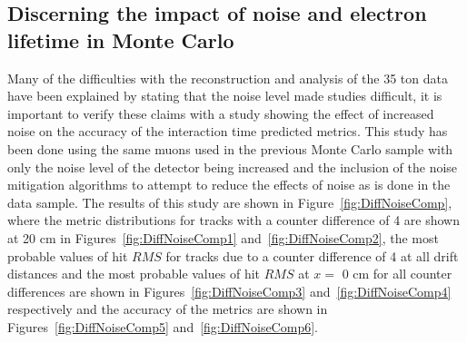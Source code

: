 \subsection{Discerning the impact of noise and electron lifetime in Monte Carlo} \label{sec:DiffMCStudies}
Many of the difficulties with the reconstruction and analysis of the 35 ton data have been explained by stating that the noise level made studies difficult, it is important to verify these claims with a study showing the effect of increased noise on the accuracy of the interaction time predicted metrics. This study has been done using the same muons used in the previous Monte Carlo sample with only the noise level of the detector being increased and the inclusion of the noise mitigation algorithms to attempt to reduce the effects of noise as is done in the data sample. The results of this study are shown in Figure~\ref{fig:DiffNoiseComp}, where the metric distributions for tracks with a counter difference of 4 are shown at 20 cm in Figures~\ref{fig:DiffNoiseComp1} and~\ref{fig:DiffNoiseComp2}, the most probable values of hit $RMS$ for tracks due to a counter difference of 4 at all drift distances and the most probable values of hit $RMS$ at $x =$ 0 cm for all counter differences are shown in Figures~\ref{fig:DiffNoiseComp3} and~\ref{fig:DiffNoiseComp4} respectively and the accuracy of the metrics are shown in Figures~\ref{fig:DiffNoiseComp5} and~\ref{fig:DiffNoiseComp6}. \\

